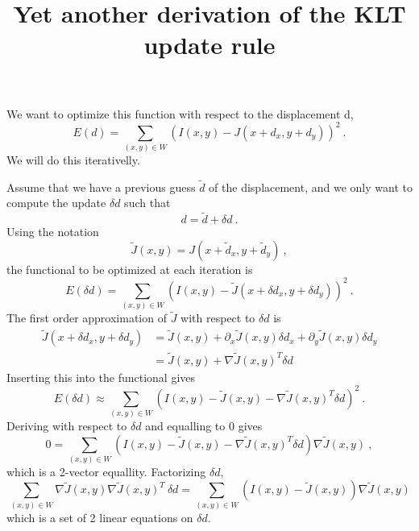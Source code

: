 \documentclass[a4paper,10pt]{article}
\title{Yet another derivation of the KLT update rule}
\author{}
\begin{document}
\maketitle

We want to optimize this function with respect to the displacement d,
\begin{equation}
 E(d) = \sum_{(x,y)\in W} (I(x,y) - J(x+d_x,y+d_y))^2 \ .
\end{equation}
We will do this iterativelly.

Assume that we have a previous guess $\tilde d$ of the displacement, and we only want to compute the update $\delta d$ such that
\begin{equation}
 d = \tilde d + \delta d \ .
\end{equation}
Using the notation
\begin{equation}
 \tilde J(x,y) = J(x + \tilde d_x, y + \tilde d_y) \ ,
\end{equation}
the functional to be optimized at each iteration is
\begin{equation}
 E(\delta d) = \sum_{(x,y)\in W} (I(x,y) - \tilde J(x + \delta d_x, y + \delta d_y))^2 \ .
\end{equation}
The first order approximation of $\tilde J$ with respect to  $\delta d$ is
\begin{equation}
\begin{split}
 \tilde J(x + \delta d_x, y + \delta d_y)
   & = \tilde J(x,y) + \partial_x \tilde J(x,y) \delta d_x + \partial_y \tilde J(x,y) \delta d_y
\\ & = \tilde J(x,y) + \nabla \tilde J(x,y)^T \delta d
\end{split}
\end{equation}
Inserting this into the functional gives
\begin{equation}
 E(\delta d) \approx \sum_{(x,y)\in W} (I(x,y) - \tilde J(x,y) - \nabla \tilde J(x,y)^T \delta d)^2 \ .
\end{equation}
Deriving with respect to $\delta d$ and equalling to 0 gives
\begin{equation}
 0 =
 \sum_{(x,y)\in W} (I(x,y) - \tilde J(x,y)
          - \nabla \tilde J(x,y)^T \delta d)
        \nabla \tilde J(x,y) \ ,
\end{equation}
which is a 2-vector equallity.  Factorizing $\delta d$,
\begin{equation}
 \sum_{(x,y)\in W} \nabla \tilde J(x,y) \nabla \tilde J(x,y)^T \  \delta d
 = \sum_{(x,y)\in W} (I(x,y) - \tilde J(x,y)) \nabla \tilde J(x,y)
\end{equation}
which is a set of 2 linear equations on $\delta d$.
\end{document}
